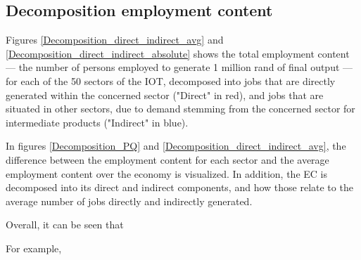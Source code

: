\documentclass[12pt,english]{article}
\begin{document}

\subsection{Decomposition employment content}
Figures \ref{Decomposition_direct_indirect_avg} and \ref{Decomposition_direct_indirect_absolute} shows the total employment content --- the number of persons employed to generate 1 million rand of final output --- for each of the 50 sectors of the IOT, decomposed into jobs that are directly generated within the concerned sector ("Direct" in red), and jobs that are situated in other sectors, due to demand stemming from the concerned sector for intermediate products ("Indirect" in blue).

In figures \ref{Decomposition_PQ} and \ref{Decomposition_direct_indirect_avg}, the difference between the employment content for each sector and the average employment content over the economy is visualized. In addition, the EC is decomposed into its direct and indirect components, and how those relate to the average number of jobs directly and indirectly generated. 

Overall, it can be seen that 

For example, 

\end{document}
